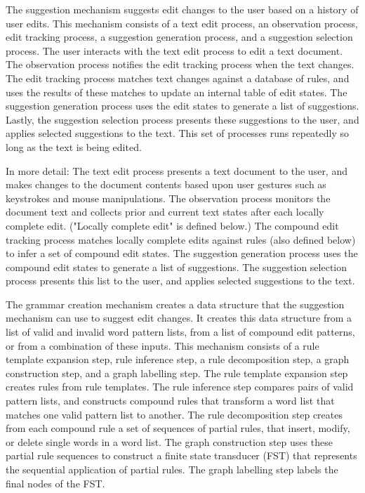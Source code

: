 \documentclass{article}
\begin{document}
The suggestion mechanism suggests edit changes to the user based on a history of user edits.  This mechanism consists of a text edit process, an observation process, edit tracking process, a suggestion generation process, and a suggestion selection process.  The user interacts with the text edit process to edit a text document.  The observation process notifies the edit tracking process when the text changes.  The edit tracking process matches text changes against a database of rules, and uses the results of these matches to update an internal table of edit states.  The suggestion generation process uses the edit states to generate a list of suggestions.  Lastly, the suggestion selection process presents these suggestions to the user, and applies selected suggestions to the text.  This set of processes runs repeatedly so long as the text is being edited.

In more detail: The text edit process presents a text document to the user, and makes changes to the document contents based upon user gestures such as keystrokes and mouse manipulations. The observation process monitors the document text and collects prior and current text states after each locally complete edit.  ("Locally complete edit" is defined below.)  The compound edit tracking process matches locally complete edits against rules (also defined below) to infer a set of compound edit states.  The suggestion generation process uses the compound edit states to generate a list of suggestions.  The suggestion selection process presents this list to the user, and applies selected suggestions to the text. 

The grammar creation mechanism creates a data structure that the suggestion mechanism can use to suggest edit changes.  It creates this data structure from a list of valid and invalid word pattern lists, from a list of compound edit patterns, or from a combination of these inputs.  This mechanism consists of a rule template expansion step, rule inference step, a rule decomposition step, a graph construction step, and a graph labelling step.  The rule template expansion step creates rules from rule templates.  The rule inference step compares pairs of valid pattern lists, and constructs compound rules that transform a word list that matches one valid pattern list to another.  The rule decomposition step creates from each compound rule a set of sequences of partial rules, that insert, modify, or delete single words in a word list.  The graph construction step uses these partial rule sequences to construct a finite state transducer (FST) that represents the sequential application of partial rules.  The graph labelling step labels the final nodes of the FST.
\end{document}
